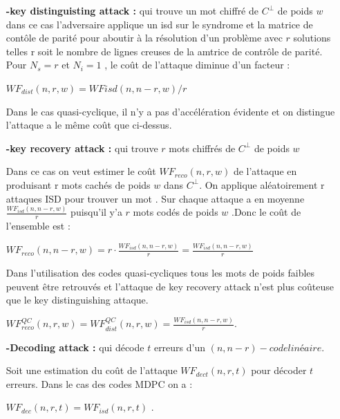 \documentclass[12pt,openany]{report}
\begin{document}
\begin{itemize}
\item[\textbf{-key distinguisting attack :}] qui trouve un mot chiffré de $ \mathit{C}^{\perp} $ de poids $w$ dans ce cas l’adversaire applique un isd sur le syndrome et la matrice de contôle de parité pour aboutir à la résolution d’un problème avec $r$ solutions telles r soit le nombre de lignes creuses de la amtrice de contrôle de parité. Pour $ N_s=r$ et $N_i=1$ , le coût de l’attaque diminue d’un facteur :

$ WF_{dist}(n,r,w)=WFisd(n,n-r,w)/r $ 

Dans le cas quasi-cyclique, il n’y a pas d’accélération évidente et on distingue
l'attaque a le même coût que ci-dessus.

\item[\textbf{-key recovery attack :}] qui trouve $r$ mots chiffrés de $ \mathit{C}^{\perp} $ de poids $w$

Dans ce cas on veut estimer le coût $WF_{reco}(n,r,w)$ de l’attaque en produisant r mots cachés de poids $w$ dans $ \mathit{C}^{\perp} $.  On applique aléatoirement r attaques ISD pour trouver un mot .\hspace{0.2cm} Sur chaque attaque a en moyenne $\frac{WF_{isd}(n,n-r,w)}{r}$ puisqu’il y’a $r$ mots codés de poids $w$ .Donc le coût de l’ensemble est :
\begin{center}
{\large

$WF_{reco}(n,n-r,w)=r \cdot \frac{WF_{isd}(n,n-r,w)}{r} 
= \frac{WF_{isd}(n,n-r,w)}{r}$}

\end{center}

Dans l’utilisation des codes quasi-cycliques tous les mots de poids faibles peuvent être retrouvés et l’attaque de key recovery attack n’est plus coûteuse que le key distinguishing attaque.
\begin{center}

{\large
$WF_{reco}^{QC}(n,r,w)= WF_{dist}^{QC}(n,r,w)= \frac{ WF_{isd}(n,n-r,w)}{r}$}.
\end{center}

\item[ \textbf{-Decoding attack :}]qui décode $t$ erreurs d’un $ (n , n-r)-code linéaire  $.

Soit une estimation du coût de l’attaque  $ WF_{dect}(n,r,t) $  pour décoder $t$ erreurs.
Dans le cas des codes MDPC on a :\begin{center}

 {\large $  WF_{dec}(n,r,t)=WF_{isd}(n,r,t)    $} .
 \end{center}


\end{itemize}
\end{document}
